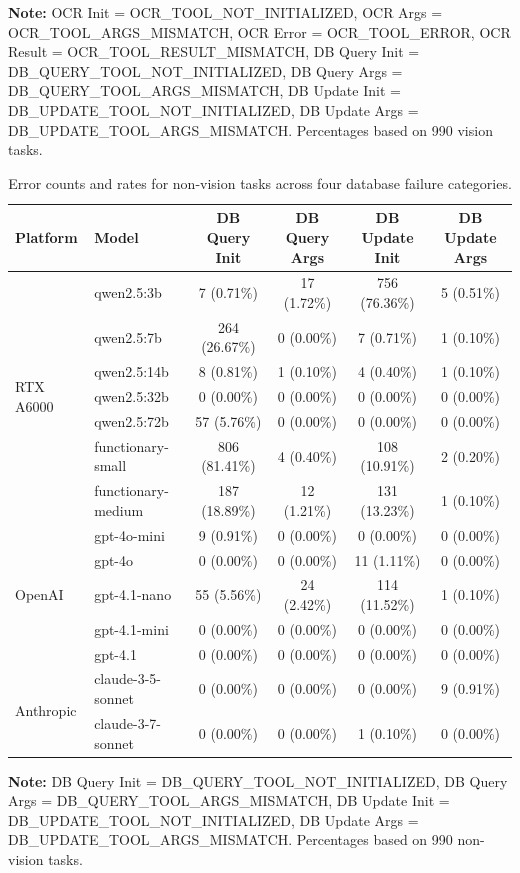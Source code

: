 \documentclass[conference]{IEEEtran}
\begin{document}
\begin{table}[htbp]
\footnotesize{\textbf{Note:} OCR Init = OCR\_TOOL\_NOT\_INITIALIZED, OCR Args = OCR\_TOOL\_ARGS\_MISMATCH, OCR Error = OCR\_TOOL\_ERROR, OCR Result = OCR\_TOOL\_RESULT\_MISMATCH, DB Query Init = DB\_QUERY\_TOOL\_NOT\_INITIALIZED, DB Query Args = DB\_QUERY\_TOOL\_ARGS\_MISMATCH, DB Update Init = DB\_UPDATE\_TOOL\_NOT\_INITIALIZED, DB Update Args = DB\_UPDATE\_TOOL\_ARGS\_MISMATCH. Percentages based on 990 vision tasks.}
\end{table}

\begin{table}[htbp]
\centering
\caption{Error counts and rates for non-vision tasks across four database failure categories.}
\label{tab:error_analysis_nonvision}
\begin{tabular}{ll|cccc}
\toprule
\textbf{Platform} & \textbf{Model} & \textbf{DB Query Init} & \textbf{DB Query Args} & \textbf{DB Update Init} & \textbf{DB Update Args} \\
\midrule
\multirow{7}{*}{RTX A6000} & qwen2.5:3b & 7 (0.71\%) & 17 (1.72\%) & 756 (76.36\%) & 5 (0.51\%) \\
 & qwen2.5:7b & 264 (26.67\%) & 0 (0.00\%) & 7 (0.71\%) & 1 (0.10\%) \\
 & qwen2.5:14b & 8 (0.81\%) & 1 (0.10\%) & 4 (0.40\%) & 1 (0.10\%) \\
 & qwen2.5:32b & 0 (0.00\%) & 0 (0.00\%) & 0 (0.00\%) & 0 (0.00\%) \\
 & qwen2.5:72b & 57 (5.76\%) & 0 (0.00\%) & 0 (0.00\%) & 0 (0.00\%) \\
 & functionary-small & 806 (81.41\%) & 4 (0.40\%) & 108 (10.91\%) & 2 (0.20\%) \\
 & functionary-medium & 187 (18.89\%) & 12 (1.21\%) & 131 (13.23\%) & 1 (0.10\%) \\
\midrule
\multirow{5}{*}{OpenAI} & gpt-4o-mini & 9 (0.91\%) & 0 (0.00\%) & 0 (0.00\%) & 0 (0.00\%) \\
 & gpt-4o & 0 (0.00\%) & 0 (0.00\%) & 11 (1.11\%) & 0 (0.00\%) \\
 & gpt-4.1-nano & 55 (5.56\%) & 24 (2.42\%) & 114 (11.52\%) & 1 (0.10\%) \\
 & gpt-4.1-mini & 0 (0.00\%) & 0 (0.00\%) & 0 (0.00\%) & 0 (0.00\%) \\
 & gpt-4.1 & 0 (0.00\%) & 0 (0.00\%) & 0 (0.00\%) & 0 (0.00\%) \\
\midrule
\multirow{2}{*}{Anthropic} & claude-3-5-sonnet & 0 (0.00\%) & 0 (0.00\%) & 0 (0.00\%) & 9 (0.91\%) \\
 & claude-3-7-sonnet & 0 (0.00\%) & 0 (0.00\%) & 1 (0.10\%) & 0 (0.00\%) \\
\bottomrule
\end{tabular}%
\vspace{0.1cm}

\footnotesize{\textbf{Note:} DB Query Init = DB\_QUERY\_TOOL\_NOT\_INITIALIZED, DB Query Args = DB\_QUERY\_TOOL\_ARGS\_MISMATCH, DB Update Init = DB\_UPDATE\_TOOL\_NOT\_INITIALIZED, DB Update Args = DB\_UPDATE\_TOOL\_ARGS\_MISMATCH. Percentages based on 990 non-vision tasks.}
\end{table}
\end{document}
